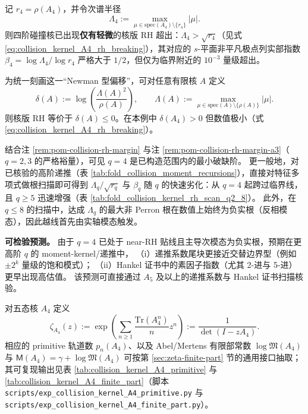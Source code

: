 \begin{remark}\label{rem:pom-collision-rh-break-a4}
记 \(r_4=\rho(A_4)\)，并令次谱半径
\[
\Lambda_4:=\max_{\mu\in\mathrm{spec}(A_4)\setminus\{r_4\}}|\mu|.
\]
 则四阶碰撞核已出现\textbf{仅有轻微}的核版 RH 超出：\(\Lambda_4>\sqrt{r_4}\)（见式 \ref{eq:collision_kernel_A4_rh_breaking}），其对应的 \(s\)-平面非平凡极点列实部指数
\(
\beta_4=\log\Lambda_4/\log r_4
\)
 严格大于 \(1/2\)，但仅为临界附近的 \(10^{-3}\) 量级超出。
\par
为统一刻画这一“Newman 型偏移”，可对任意有限核 \(A\) 定义
\[
\delta(A):=\log\!\left(\frac{\Lambda(A)^2}{\rho(A)}\right),
\qquad
\Lambda(A):=\max_{\mu\in\mathrm{spec}(A)\setminus\{\rho(A)\}}|\mu|.
\]
则核版 RH 等价于 \(\delta(A)\le 0\)。在本例中 \(\delta(A_4)>0\) 但数值极小（式 \ref{eq:collision_kernel_A4_rh_breaking}）。
\par
结合注 \ref{rem:pom-collision-rh-margin} 与注 \ref{rem:pom-collision-rh-margin-a3}（\(q=2,3\) 的严格裕量），可见 \(q=4\) 是已构造范围内的最小破缺阶。
更一般地，对已核验的高阶递推（表 \ref{tab:fold_collision_moment_recursions}），直接对特征多项式做根扫描即可得到
\(\Lambda_q/\sqrt{r_q}\) 与 \(\beta_q\) 随 \(q\) 的快速劣化：从 \(q=4\) 起跨过临界线，且 \(q\ge 5\) 迅速增强（表 \ref{tab:fold_collision_kernel_rh_scan_q2_8}）。
此外，在 \(q\le 8\) 的扫描中，达成 \(\Lambda_q\) 的最大非 Perron 根在数值上始终为负实根（反相模态），因此越线首先由实轴模态触发。
\par
\textbf{可检验预测。} 由于 \(q=4\) 已处于 near-RH 贴线且主导次模态为负实根，预期在更高阶 \(q\) 的 moment-kernel/递推中，
（i）递推系数尾块更接近交替边界型（例如 \(\pm 2^k\) 量级的饱和模式）；
（ii）Hankel 证书中的素因子指数（尤其 2-进与 5-进）更早出现高估值。
该预测可直接通过 \(A_5\) 及以上的递推系数与 Hankel 证书扫描核验。
\end{remark}





\begin{definition}\label{def:pom-collision-zeta-a4}
对五态核 \(A_4\) 定义
$$
\zeta_{A_4}(z):=\exp\!\left(\sum_{n\ge 1}\frac{\mathrm{Tr}(A_4^n)}{n}z^n\right)
:=\frac{1}{\det(I-zA_4)}.
$$
相应的 primitive 轨道数 \(p_n(A_4)\)、以及 Abel/Mertens 有限部常数 \(\log\mathfrak{M}(A_4)\) 与 \(\mathsf{M}(A_4)=\gamma+\log\mathfrak{M}(A_4)\) 可按第 \ref{sec:zeta-finite-part} 节的通用接口抽取；其可复现输出见表 \ref{tab:collision_kernel_A4_primitive} 与 \ref{tab:collision_kernel_A4_finite_part}（脚本 \texttt{scripts/exp\_collision\_kernel\_A4\_primitive.py} 与 \texttt{scripts/exp\_collision\_kernel\_A4\_finite\_part.py}）。
\end{definition}

